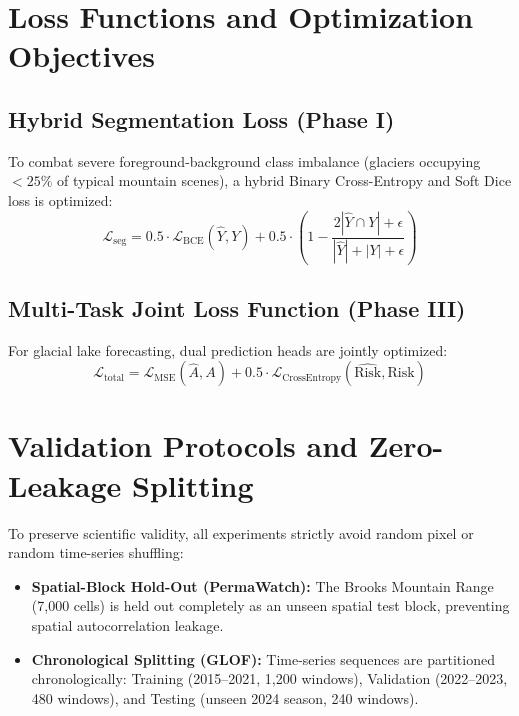 \documentclass[12pt,a4paper]{report}
\begin{document}
\section{Loss Functions and Optimization Objectives}
\subsection{Hybrid Segmentation Loss (Phase I)}
To combat severe foreground-background class imbalance (glaciers occupying $<25\%$ of typical mountain scenes), a hybrid Binary Cross-Entropy and Soft Dice loss is optimized:
\begin{equation}
    \mathcal{L}_{\text{seg}} = 0.5 \cdot \mathcal{L}_{\text{BCE}}(\hat{Y}, Y) + 0.5 \cdot \left(1 - \frac{2 |\hat{Y} \cap Y| + \epsilon}{|\hat{Y}| + |Y| + \epsilon}\right)
    \label{eq:hybrid_loss}
\end{equation}

\subsection{Multi-Task Joint Loss Function (Phase III)}
For glacial lake forecasting, dual prediction heads are jointly optimized:
\begin{equation}
    \mathcal{L}_{\text{total}} = \mathcal{L}_{\text{MSE}}(\hat{A}, A) + 0.5 \cdot \mathcal{L}_{\text{CrossEntropy}}(\hat{\text{Risk}}, \text{Risk})
    \label{eq:multitask_loss}
\end{equation}

\section{Validation Protocols and Zero-Leakage Splitting}
To preserve scientific validity, all experiments strictly avoid random pixel or random time-series shuffling:
\begin{itemize}
    \item \textbf{Spatial-Block Hold-Out (PermaWatch):} The Brooks Mountain Range (7,000 cells) is held out completely as an unseen spatial test block, preventing spatial autocorrelation leakage.
    \item \textbf{Chronological Splitting (GLOF):} Time-series sequences are partitioned chronologically: Training (2015--2021, 1,200 windows), Validation (2022--2023, 480 windows), and Testing (unseen 2024 season, 240 windows).
\end{itemize}
\end{document}
